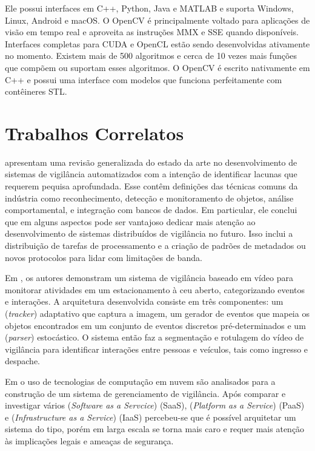 \documentclass[12pt, %
openright, 
oneside, %
a4paper,    %
brazil]{facom-ufu-abntex2}
\begin{document}
Ele possui interfaces em C++, Python, Java e MATLAB e suporta Windows, Linux,
Android e macOS. O OpenCV é principalmente voltado para aplicações de visão em
tempo real e aproveita as instruções MMX e SSE quando disponíveis. Interfaces
completas para CUDA e OpenCL estão sendo desenvolvidas ativamente no momento.
Existem mais de 500 algoritmos e cerca de 10 vezes mais funções que compõem ou
suportam esses algoritmos. O OpenCV é escrito nativamente em C++ e possui uma
interface com modelos que funciona perfeitamente com contêineres STL.
\cite{opencvwebsite}

\section{Trabalhos Correlatos}

 apresentam uma revisão generalizada do
estado da arte no desenvolvimento de sistemas de vigilância automatizados com a
intenção de identificar lacunas que requerem pequisa aprofundada. Esse contêm
definições das técnicas comuns da indústria como reconhecimento, detecção e
monitoramento de objetos, análise comportamental, e integração com bancos de
dados. Em particular, ele conclui que em alguns aspectos pode ser vantajoso
dedicar mais atenção ao desenvolvimento de sistemas distribuídos de vigilância
no futuro. Isso inclui a distribuição de tarefas de processamento e a criação
de padrões de metadados ou novos protocolos para lidar com limitações de banda.

Em , os autores demonstram um sistema de vigilância baseado
em vídeo para monitorar atividades em um estacionamento à ceu aberto,
categorizando eventos e interações. A arquitetura desenvolvida consiste em três
componentes: um (\textit{\foreignlanguage{english}{tracker}}) adaptativo que
captura a imagem, um gerador de eventos que mapeia os objetos encontrados em um
conjunto de eventos discretos pré-determinados e um
(\textit{\foreignlanguage{english}{parser}}) estocástico. O sistema então faz a
segmentação e rotulagem do vídeo de vigilância para identificar interações
entre pessoas e veículos, tais como ingresso e despache.

Em  o uso de tecnologias de computação em nuvem são
analisados para a construção de um sistema de gerenciamento de vigilância. Após
comparar e investigar vários (\textit{\foreignlanguage{english}{Software as a
		Servcice}}) (SaaS), (\textit{\foreignlanguage{english}{Platform as a Service}})
(PaaS) e (\textit{\foreignlanguage{english}{Infrastructure as a Service}})
(IaaS) percebeu-se que é possível arquitetar um sistema do tipo, porém em larga
escala se torna mais caro e requer mais atenção às implicações legais e ameaças
de segurança.
\end{document}
